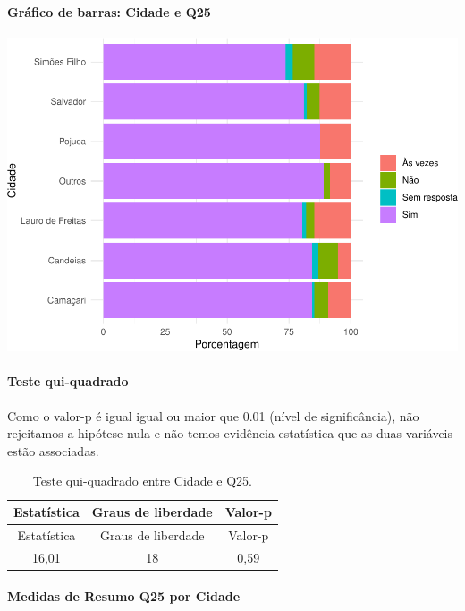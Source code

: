 \documentclass[]{article}
\let\oldparagraph\paragraph
\renewcommand{\paragraph}[1]{\oldparagraph{#1}\mbox{}}
\begin{document}
\hypertarget{gruxe1fico-de-barras-cidade-e-q25}{%
\paragraph{Gráfico de barras: Cidade e Q25}\label{gruxe1fico-de-barras-cidade-e-q25}}

\begin{center}\includegraphics[width=0.75\linewidth]{relatorio_covid19_files/figure-latex/unnamed-chunk-663-1} \end{center}

\hypertarget{teste-qui-quadrado-57}{%
\paragraph{Teste qui-quadrado}\label{teste-qui-quadrado-57}}

Como o valor-p é igual igual ou maior que 0.01 (nível de significância), não rejeitamos a hipótese nula e não temos evidência estatística que as duas variáveis estão associadas.

\begin{longtable}[]{@{}ccc@{}}
\caption{\label{tab:unnamed-chunk-665}Teste qui-quadrado entre Cidade e Q25.}\tabularnewline
\toprule
Estatística & Graus de liberdade & Valor-p\tabularnewline
\midrule
\endfirsthead
\toprule
Estatística & Graus de liberdade & Valor-p\tabularnewline
\midrule
\endhead
16,01 & 18 & 0,59\tabularnewline
\bottomrule
\end{longtable}

\cleardoublepage

\hypertarget{medidas-de-resumo-q25-por-cidade}{%
\paragraph{Medidas de Resumo Q25 por Cidade}\label{medidas-de-resumo-q25-por-cidade}}
\end{document}
